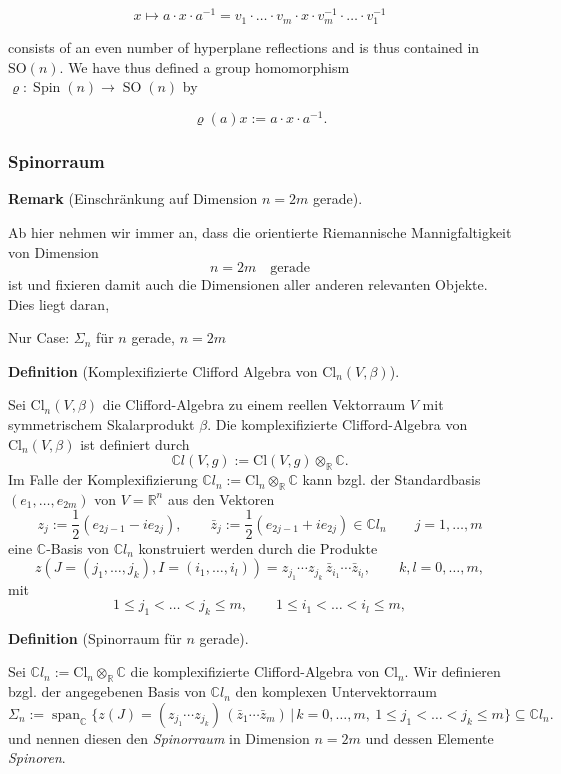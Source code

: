 \documentclass[10pt, letterpaper]{article}
\newcommand{\R}{\mathbb{R}}
\newcommand{\C}{\mathbb{C}}
\newcommand{\Cl}{\mathrm{Cl}}
\newcommand{\CustomHeading}[3]{%
  \par\medskip\noindent%
  \textbf{#1 #2} \textnormal{(#3)}.\enskip%
}
\newenvironment{DEF}[2]{\CustomHeading{Definition}{#1}{#2}}{}
\newenvironment{REM}[2]{\CustomHeading{Remark}{#1}{#2}}{}
\begin{document}
$$
x \mapsto a \cdot x \cdot a^{-1}=v_1 \cdot \ldots \cdot v_m \cdot x \cdot v_m^{-1} \cdot \ldots \cdot v_1^{-1}
$$

consists of an even number of hyperplane reflections and is thus contained in $\mathrm{SO}(n)$. We have thus defined a group homomorphism $\varrho: \operatorname{Spin}(n) \rightarrow \operatorname{SO}(n)$ by

$$
\varrho(a) x:=a \cdot x \cdot a^{-1} .
$$

\subsubsection{Spinorraum}


\begin{REM}{}{Einschränkung auf Dimension $n=2m$ gerade}
  Ab hier nehmen wir immer an, dass die orientierte Riemannische Mannigfaltigkeit von Dimension
  $$n=2m\quad \text{gerade}$$ 
  ist und fixieren damit auch die Dimensionen aller anderen relevanten Objekte. {\color{blue} Dies liegt daran, }
\end{REM}

{\color{blue} Nur Case: $\Sigma_n$ für $n$ gerade, $n=2m$}




\begin{DEF}{}{Komplexifizierte Clifford Algebra von $\Cl_n(V,\beta)$}
  Sei $\Cl_n(V,\beta)$ die Clifford-Algebra zu einem reellen Vektorraum $V$ mit symmetrischem Skalarprodukt $\beta$. Die komplexifizierte Clifford-Algebra von $\Cl_n(V,\beta)$ ist definiert durch 
  \[
  \C l(V,g):=\Cl(V,g)\otimes_{\R}\C.
  \]
  Im Falle der Komplexifizierung $\C l_n:= \Cl_n\otimes_{\R}\C$ kann bzgl. der Standardbasis $(e_1,…,e_{2m})$ von $V=\R^n$ aus den Vektoren
  \[
  z_j:=\frac12(e_{2j-1}-i e_{2j}),\qquad
  \bar z_j:=\frac12(e_{2j-1}+i e_{2j})\in \C l_n\qquad  j=1,\dots,m
  \] 
  eine $\C$-Basis von $\C l_n$ konstruiert werden durch die Produkte
  \[
  z(J=(j_1,…,j_k),I=(i_1,…,i_l))=z_{j_1}\cdots z_{j_k}\,\bar z_{i_1}\cdots \bar z_{i_l},
  \qquad k,l=0,\dots,m,
  \]
  mit
  \[
  1\le j_1<\dots<j_k\le m,\qquad 1\le i_1<\dots<i_l\le m,
  \]
\end{DEF}




\begin{DEF}{}{Spinorraum für $n$ gerade}
Sei $\C l_n:=\Cl_n\otimes_{\R}\C$ die komplexifizierte Clifford-Algebra von $\Cl_n$. Wir definieren bzgl. der angegebenen Basis von $\C l_n$ den komplexen Untervektorraum
\[
\Sigma_n:=
\operatorname{span}_{\C}\bigl\{
z(J)=\left(z_{j_1}\cdots z_{j_k}\right)\,\left(\bar z_1\cdots \bar z_m\right)\,\big|\,
k=0,\dots,m,\ 1\le j_1<\dots<j_k\le m
\bigr\}
\subseteq \C l_n.
\]
und nennen diesen den \emph{Spinorraum} in Dimension $n=2m$ und dessen Elemente \emph{Spinoren}.
\end{DEF}
\end{document}
